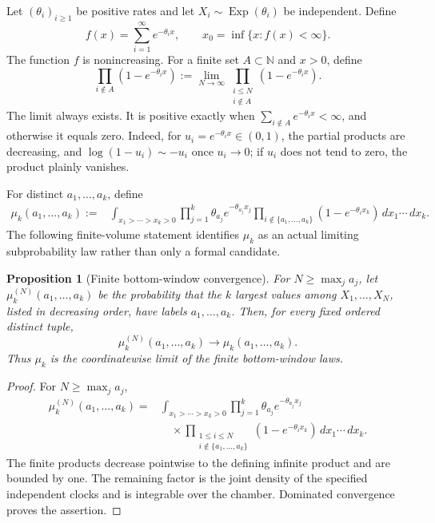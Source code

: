 \documentclass[11pt]{article}
\newtheorem{proposition}[theorem]{Proposition}
\theoremstyle{remark}
\newcommand{\Exp}{\operatorname{Exp}}
\newcommand{\dd}{\,d}
\begin{document}
Let \((\theta_i)_{i\ge1}\) be positive rates and let \(X_i\sim\Exp(\theta_i)\) be independent.  Define
\[
        f(x)=\sum_{i=1}^{\infty}e^{-\theta_i x},
        \qquad
        x_0=\inf\{x:f(x)<\infty\}.
\]
The function $f$ is nonincreasing.  For a finite set $A\subset\mathbb N$ and
$x>0$, define
\[
 \prod_{i\notin A}(1-e^{-\theta_i x})
 :=\lim_{N\to\infty}
 \prod_{\substack{i\le N\\i\notin A}}(1-e^{-\theta_i x}).
\]
The limit always exists.  It is positive exactly when
$\sum_{i\notin A}e^{-\theta_i x}<\infty$, and otherwise it equals zero.  Indeed,
for $u_i=e^{-\theta_i x}\in(0,1)$, the partial products are decreasing, and
$\log(1-u_i)\sim-u_i$ once $u_i\to0$; if $u_i$ does not tend to zero, the
product plainly vanishes.

For distinct \(a_1,\ldots,a_k\), define
\[
\begin{aligned}
\mu_k(a_1,\ldots,a_k)
  :=& \int_{x_1>\cdots>x_k>0}
     \prod_{j=1}^k \theta_{a_j}e^{-\theta_{a_j}x_j}
     \prod_{i\notin\{a_1,\ldots,a_k\}}
       (1-e^{-\theta_i x_k})
     \dd x_1\cdots\dd x_k .
\end{aligned}
\]
The following finite-volume statement identifies $\mu_k$ as an actual limiting
subprobability law rather than only a formal candidate.

\begin{proposition}[Finite bottom-window convergence]
\label{prop:finite-bottom-convergence}
For $N\ge\max_j a_j$, let
$\mu_k^{(N)}(a_1,\ldots,a_k)$ be the probability that the $k$ largest values
among $X_1,\ldots,X_N$, listed in decreasing order, have labels
$a_1,\ldots,a_k$.  Then, for every fixed ordered distinct tuple,
\[
        \mu_k^{(N)}(a_1,\ldots,a_k)
        \longrightarrow\mu_k(a_1,\ldots,a_k).
\]
Thus $\mu_k$ is the coordinatewise limit of the finite bottom-window laws.
\end{proposition}

\begin{proof}
For $N\ge\max_j a_j$,
\begin{align*}
\mu_k^{(N)}(a_1,\ldots,a_k)
=&\int_{x_1>\cdots>x_k>0}
 \prod_{j=1}^k\theta_{a_j}e^{-\theta_{a_j}x_j}\\
&\quad\times
 \prod_{\substack{1\le i\le N\\i\notin\{a_1,\ldots,a_k\}}}
 (1-e^{-\theta_i x_k})
 \dd x_1\cdots\dd x_k.
\end{align*}
The finite products decrease pointwise to the defining infinite product and are
bounded by one.  The remaining factor is the joint density of the specified
independent clocks and is integrable over the chamber.  Dominated convergence
proves the assertion.
\end{proof}
\end{document}
